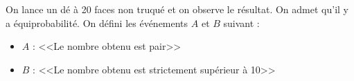 	On lance un dé à 20 faces non truqué et on observe le résultat. On admet qu'il y a équiprobabilité. On défini les événements $A$ et $B$ suivant :
	
	\begin{itemize}
		\item $A$ : <<Le nombre obtenu est pair>>
		\item $B$ : <<Le nombre obtenu est strictement supérieur à 10>>
	\end{itemize} 
	
	